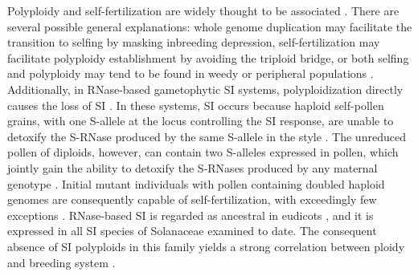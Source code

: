 Polyploidy and self-fertilization are widely thought to be associated \citep{stebbins1950}.
There are several possible general explanations: whole genome duplication may facilitate the transition to selfing by masking inbreeding depression, self-fertilization may facilitate polyploidy establishment by avoiding the triploid bridge, or both selfing and polyploidy may tend to be found in weedy or peripheral populations \citep{ramsey_1998, barringer2007, barrett2008, husband2008}.
Additionally, in RNase-based gametophytic SI systems, polyploidization directly causes the loss of SI \citep{stout1942, lewis1947}.
In these systems, SI occurs because haploid self-pollen grains, with one S-allele at the locus controlling the SI response, are unable to detoxify the S-RNase produced by the same S-allele in the style \citep{kubo2010}.
The unreduced pollen of diploids, however, can contain two S-alleles expressed in pollen, which jointly gain the ability to detoxify the S-RNases produced by any maternal genotype \citep{entani1999, tsukamoto2005, kubo2010}.
Initial mutant individuals with pollen containing doubled haploid genomes are consequently capable of self-fertilization, with exceedingly few exceptions \citep{hauck_2002, nunes_2006}.
RNase-based SI is regarded as ancestral in eudicots \citep{igic_2001,steinbachs_2002}, and it is expressed in all SI species of Solanaceae examined to date.
The consequent absence of SI polyploids in this family yields a strong correlation between ploidy and breeding system \citep{robertson_2011}.

